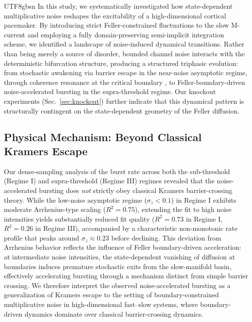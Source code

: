 ﻿\documentclass[reprint, amsmath, amssymb, aps, pre]{revtex4-2}
\begin{document}
\begin{CJK*}{UTF8}{gbsn}
In this study, we systematically investigated how state-dependent multiplicative noise reshapes the excitability of a high-dimensional cortical pacemaker. By introducing strict Feller-constrained fluctuations to the slow M-current and employing a fully domain-preserving semi-implicit integration scheme, we identified a landscape of noise-induced dynamical transitions. Rather than being merely a source of disorder, bounded channel noise interacts with the deterministic bifurcation structure, producing a structured triphasic evolution: from stochastic awakening via barrier escape in the near-noise asymptotic regime, through coherence resonance at the critical boundary \cite{pikovsky1997coherence}, to Feller-boundary-driven noise-accelerated bursting \cite{hanggi1990reaction} in the supra-threshold regime. Our knockout experiments (Sec.~\ref{sec:knockout}) further indicate that this dynamical pattern is structurally contingent on the state-dependent geometry of the Feller diffusion.

\subsection{Physical Mechanism: Beyond Classical Kramers Escape}
Our dense-sampling analysis of the burst rate across both the sub-threshold (Regime I) and supra-threshold (Regime III) regimes revealed that the noise-accelerated bursting does \textit{not} strictly obey classical Kramers barrier-crossing theory. While the low-noise asymptotic regime ($\sigma_z < 0.1$) in Regime I exhibits moderate Arrhenius-type scaling ($R^2 = 0.75$), extending the fit to high noise intensities yields substantially reduced fit quality ($R^2 = 0.73$ in Regime I, $R^2 = 0.26$ in Regime III), accompanied by a characteristic non-monotonic rate profile that peaks around $\sigma_z \approx 0.23$ before declining. This deviation from Arrhenius behavior reflects the influence of Feller boundary-driven acceleration: at intermediate noise intensities, the state-dependent vanishing of diffusion at boundaries induces premature stochastic exits from the slow-manifold basin, effectively accelerating bursting through a mechanism distinct from simple barrier crossing. We therefore interpret the observed noise-accelerated bursting as a generalization of Kramers escape to the setting of boundary-constrained multiplicative noise in high-dimensional fast--slow systems, where boundary-driven dynamics dominate over classical barrier-crossing dynamics.


\end{CJK*}
\end{document}
